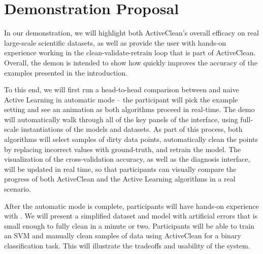\section{Demonstration Proposal}
In our demonstration, we will highlight both ActiveClean's overall efficacy on real large-scale scientific datasets, as well as provide the 
user with hands-on experience working in the clean-validate-retrain loop that is part of ActiveClean.  
Overall, the demon is intended to show how \sys quickly improves the accuracy of the examples presented in the introduction.

To this end, we will first run a head-to-head comparison between \sys and naive Active Learning in automatic mode -- the participant will pick the example setting and see an animation as both algorithms proceed in real-time.
The demo will automatically walk through all of the key panels of the interface, using full-scale instantiations of the models and datasets.
As part of this process, both algorithms will select samples of dirty data points, automatically clean the points by replacing incorrect values with ground-truth, and retrain the model.  
The visualization of the cross-validation accuracy, as well as the diagnosis interface, will be updated in real time, so that participants can visually compare the progress of both ActiveClean and
the Active Learning algorithms in a real scenario.



After the automatic mode is complete, participants will have hands-on experience with \sys.
We will present a simplified dataset and model with artificial errors that is small enough to fully clean in a minute or two.
Participants will be able to train an SVM and manually clean samples of data using ActiveClean for a binary classification task.
This will illustrate the tradeoffs and usability of the system.

